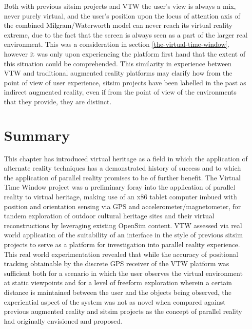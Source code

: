Both with previous sitsim projects and VTW the user's view is always a mix, never purely virtual, and the user's position upon the locus of attention axis of the combined Milgram/Waterworth model can never reach its virtual reality extreme, due to the fact that the screen is always seen as a part of the larger real environment. This was a consideration in section \ref{the-virtual-time-window}, however it was only upon experiencing the platform first hand that the extent of this situation could be comprehended. This similarity in experience between VTW and traditional augmented reality platforms may clarify how from the point of view of user experience, sitsim projects have been labelled in the past as indirect augmented reality, even if from the point of view of the environments that they provide, they are distinct.


\section{Summary}

This chapter has introduced virtual heritage as a field in which the application of alternate reality techniques has a demonstrated history of success and to which the application of parallel reality promises to be of further benefit. The Virtual Time Window project was a preliminary foray into the application of parallel reality to virtual heritage, making use of an x86 tablet computer imbued with position and orientation sensing via GPS and accelerometer/magnetometer, for tandem exploration of outdoor cultural heritage sites and their virtual reconstructions by leveraging existing OpenSim content. VTW assessed via real world application of the suitability of an interface in the style of previous sitsim projects to serve as a platform for investigation into parallel reality experience. This real world experimentation revealed that while the accuracy of positional tracking obtainable by the discrete GPS receiver of the VTW platform was sufficient both for a scenario in which the user observes the virtual environment at static viewpoints and for a level of freeform exploration wherein a certain distance is maintained between the user and the objects being observed, the experiential aspect of the system was not as novel when compared against previous augmented reality and sitsim projects as the concept of parallel reality had originally envisioned and proposed.

